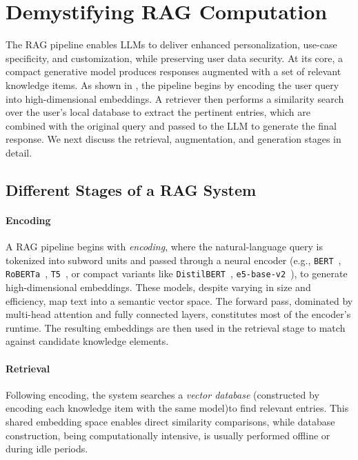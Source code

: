 \section{Demystifying RAG Computation}
\label{sec:02BGnMotivation}
%

The RAG pipeline enables LLMs to deliver enhanced personalization, use-case specificity, and customization, while preserving user data security. At its core, a compact generative model produces responses augmented with a set of \topk{} relevant knowledge items. As shown in , the pipeline begins by encoding the user query into high-dimensional embeddings. A retriever then performs a similarity search over the user’s local database to extract the \topk{} pertinent entries, which are combined with the original query and passed to the LLM to generate the final response. We next discuss the retrieval, augmentation, and generation stages in detail.

\subsection{Different Stages of a RAG System}
\label{sec:BG:RAGstage}
\noindent\paragraph{Encoding}
\label{sec:BG:Encoding}
A RAG pipeline begins with \emph{encoding}, where the natural-language query is tokenized into subword units and passed through a neural encoder (e.g., \texttt{BERT}~\cite{devlin2019bert}, \texttt{RoBERTa}~\cite{liu2019roberta}, \texttt{T5}~\cite{raffel2020exploring}, or compact variants like \texttt{DistilBERT}~\cite{sanh2019distilbert}, \texttt{e5-base-v2}~\cite{wang2022text}), to generate high-dimensional embeddings. These models, despite varying in size and efficiency, map text into a semantic vector space. The forward pass, dominated by multi-head attention and fully connected layers, constitutes most of the encoder’s runtime. The resulting embeddings are then used in the retrieval stage to match against candidate knowledge elements.

\noindent\paragraph{Retrieval}
\label{sec:BG:Retrieval}
Following encoding, the system searches a \emph{vector database} (constructed by encoding each knowledge item with the same model)to find relevant entries. This shared embedding space enables direct similarity comparisons, while database construction, being computationally intensive, is usually performed offline or during idle periods.


